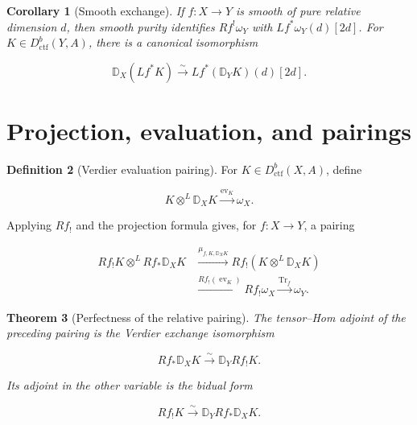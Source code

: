 \documentclass[10pt]{article}
\newtheorem{theorem}{Theorem}[section]
\newtheorem{corollary}[theorem]{Corollary}
\theoremstyle{definition}
\newtheorem{definition}[theorem]{Definition}
\newcommand{\Dctf}{D^b_{\mathrm{ctf}}}
\newcommand{\DD}{\mathbb D}
\newcommand{\Tr}{\operatorname{Tr}}
\begin{document}
\begin{corollary}[Smooth exchange]
If \(f:X\to Y\) is smooth of pure relative dimension \(d\), then smooth
purity identifies \(Rf^!\omega_Y\) with
\(Lf^*\omega_Y(d)[2d]\).  For \(K\in\Dctf(Y,A)\), there is a canonical
isomorphism

\[
 \DD_X(Lf^*K)
 \xrightarrow{\sim}Lf^*(\DD_YK)(d)[2d].
\]
\end{corollary}

\section{Projection, evaluation, and pairings}

\begin{definition}[Verdier evaluation pairing]
For \(K\in\Dctf(X,A)\), define

\[
 K\otimes^L\DD_XK\xrightarrow{\operatorname{ev}_K}\omega_X.
\]

Applying \(Rf_!\) and the projection formula gives, for
\(f:X\to Y\), a pairing

\[
\begin{aligned}
 Rf_!K\otimes^LRf_*\DD_XK
 &\xrightarrow{\mu_{f,K,\DD_XK}}
 Rf_!(K\otimes^L\DD_XK)\\
 &\xrightarrow{Rf_!(\operatorname{ev}_K)}Rf_!\omega_X
 \xrightarrow{\Tr_f} \omega_Y.
\end{aligned}
\]
\end{definition}

\begin{theorem}[Perfectness of the relative pairing]
The tensor--Hom adjoint of the preceding pairing is the Verdier exchange
isomorphism

\[
 Rf_*\DD_XK\xrightarrow{\sim}\DD_YRf_!K.
\]

Its adjoint in the other variable is the bidual form

\[
 Rf_!K\xrightarrow{\sim}\DD_YRf_*\DD_XK.
\]
\end{theorem}
\end{document}
